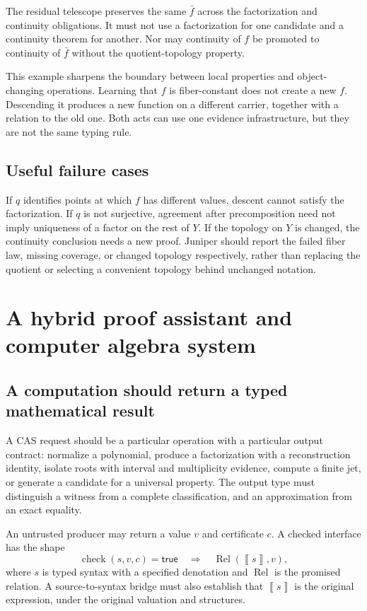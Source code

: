 \documentclass[11pt,a4paper]{article}
\newcommand{\floorc}[1]{\left\llbracket #1\right\rrbracket}
\theoremstyle{definition}\newtheorem{definition}[theorem]{Definition}
\theoremstyle{remark}\newtheorem{remark}[theorem]{Remark}
\begin{document}
The residual telescope preserves the same $\bar f$ across the factorization and continuity obligations. It must not use a factorization for one candidate and a continuity theorem for another. Nor may continuity of $f$ be promoted to continuity of $\bar f$ without the quotient-topology property.

This example sharpens the boundary between local properties and object-changing operations. Learning that $f$ is fiber-constant does not create a new $f$. Descending it produces a new function on a different carrier, together with a relation to the old one. Both acts can use one evidence infrastructure, but they are not the same typing rule.

\subsection{Useful failure cases}
If $q$ identifies points at which $f$ has different values, descent cannot satisfy the factorization. If $q$ is not surjective, agreement after precomposition need not imply uniqueness of a factor on the rest of $Y$. If the topology on $Y$ is changed, the continuity conclusion needs a new proof. Juniper should report the failed fiber law, missing coverage, or changed topology respectively, rather than replacing the quotient or selecting a convenient topology behind unchanged notation.

\section{A hybrid proof assistant and computer algebra system}
\label{sec:cas}
\subsection{A computation should return a typed mathematical result}
A CAS request should be a particular operation with a particular output contract: normalize a polynomial, produce a factorization with a reconstruction identity, isolate roots with interval and multiplicity evidence, compute a finite jet, or generate a candidate for a universal property. The output type must distinguish a witness from a complete classification, and an approximation from an exact equality.

An untrusted producer may return a value $v$ and certificate $c$. A checked interface has the shape
\[
 \operatorname{check}(s,v,c)=\mathsf{true}
 \quad\Longrightarrow\quad
 \operatorname{Rel}(\floorc{s},v),
\]
where $s$ is typed syntax with a specified denotation and $\operatorname{Rel}$ is the promised relation. A source-to-syntax bridge must also establish that $\floorc{s}$ is the original expression, under the original valuation and structures.
\end{document}
